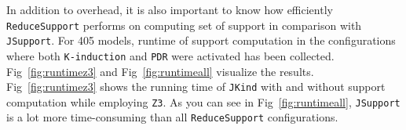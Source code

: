 \vspace{6pt}
\noindent{}
 \vspace{6pt}

In addition to overhead, it is also important to know how efficiently \texttt{ReduceSupport} performs on computing set of support in comparison with \texttt{JSupport}. For 405 models, runtime of support computation in the configurations where both \texttt{K-induction} and \texttt{PDR} were activated has been collected. Fig~\ref{fig:runtimez3} and Fig~\ref{fig:runtimeall} visualize the results. Fig~\ref{fig:runtimez3} shows the running time of \texttt{JKind} with and without support computation while employing \texttt{Z3}. As you can see in Fig~\ref{fig:runtimeall}, \texttt{JSupport} is a lot more time-consuming than all \texttt{ReduceSupport} configurations.
\fi 






